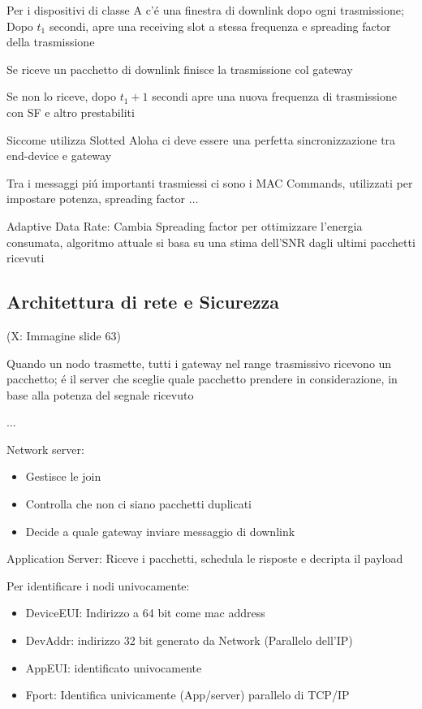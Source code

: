 \documentclass{article}
\begin{document}
Per i dispositivi di classe A c'\'e una finestra di downlink dopo ogni trasmissione; Dopo $t_1$ secondi, apre una receiving slot a stessa frequenza e spreading factor della trasmissione

Se riceve un pacchetto di downlink finisce la trasmissione col gateway

Se non lo riceve, dopo $t_1 + 1$ secondi apre una nuova frequenza di trasmissione con SF e altro prestabiliti

Siccome utilizza Slotted Aloha ci deve essere una perfetta sincronizzazione tra end-device e gateway

Tra i messaggi pi\'u importanti trasmiessi ci sono i MAC Commands, utilizzati per impostare potenza, spreading factor $\ldots$


Adaptive Data Rate: Cambia Spreading factor per ottimizzare l'energia consumata, algoritmo attuale si basa su una stima dell'SNR dagli ultimi pacchetti ricevuti

\subsection{Architettura di rete e Sicurezza}
\begin{center}
(X: Immagine slide 63)
\end{center}

Quando un nodo trasmette, tutti i gateway nel range trasmissivo ricevono un pacchetto; \'e il server che sceglie quale pacchetto prendere in considerazione, in base alla potenza del segnale ricevuto

$\ldots$

Network server:
\begin{itemize}
    \item Gestisce le join
    \item Controlla che non ci siano pacchetti duplicati
    \item Decide a quale gateway inviare messaggio di downlink
\end{itemize}

Application Server: Riceve i pacchetti, schedula le risposte e decripta il payload

Per identificare i nodi univocamente:
\begin{itemize}
    \item DeviceEUI: Indirizzo a 64 bit come mac address
    \item DevAddr: indirizzo 32 bit generato da Network (Parallelo dell'IP)
    \item AppEUI: identificato univocamente
    \item Fport: Identifica univicamente (App/server) parallelo di TCP/IP
\end{itemize}
\end{document}
